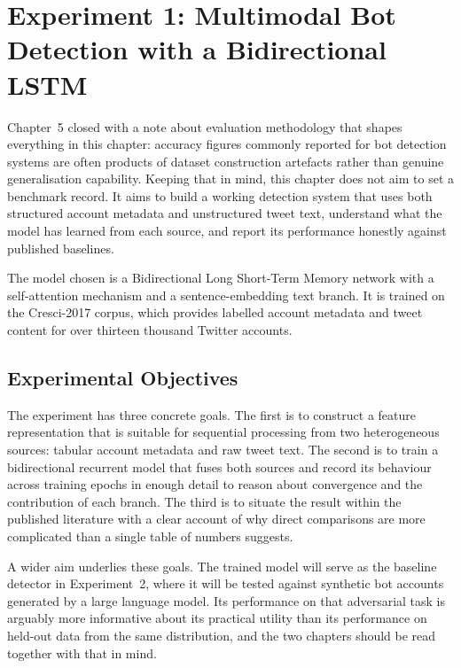 
\chapter{Experiment 1: Multimodal Bot Detection with a Bidirectional LSTM}
\label{chap:experiment1}

Chapter~5 closed with a note about evaluation methodology that shapes
everything in this chapter: accuracy figures commonly reported for bot
detection systems are often products of dataset construction artefacts
rather than genuine generalisation capability. Keeping that in mind, this
chapter does not aim to set a benchmark record. It aims to build a working
detection system that uses both structured account metadata and unstructured
tweet text, understand what the model has learned from each source, and
report its performance honestly against published baselines.

The model chosen is a Bidirectional Long Short-Term Memory network with a
self-attention mechanism and a sentence-embedding text branch. It is trained
on the Cresci-2017 corpus, which provides labelled account metadata and tweet
content for over thirteen thousand Twitter accounts.

\section{Experimental Objectives}

The experiment has three concrete goals. The first is to construct a feature
representation that is suitable for sequential processing from two
heterogeneous sources: tabular account metadata and raw tweet text. The second
is to train a bidirectional recurrent model that fuses both sources and record
its behaviour across training epochs in enough detail to reason about
convergence and the contribution of each branch. The third is to situate the
result within the published literature with a clear account of why direct
comparisons are more complicated than a single table of numbers suggests.

A wider aim underlies these goals. The trained model will serve as the
baseline detector in Experiment~2, where it will be tested against synthetic
bot accounts generated by a large language model. Its performance on that
adversarial task is arguably more informative about its practical utility than
its performance on held-out data from the same distribution, and the two
chapters should be read together with that in mind.

